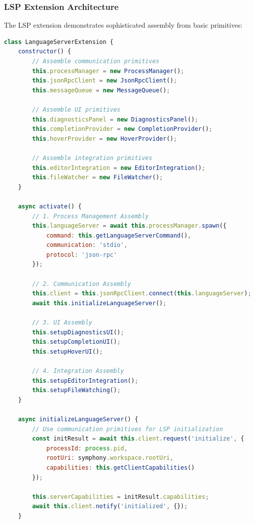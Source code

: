 \subsubsection*{LSP Extension Architecture}

The LSP extension demonstrates sophisticated assembly from basic primitives:

\begin{lstlisting}[language=JavaScript, caption=LSP Extension Assembly Process]
class LanguageServerExtension {
    constructor() {
        // Assemble communication primitives
        this.processManager = new ProcessManager();
        this.jsonRpcClient = new JsonRpcClient();
        this.messageQueue = new MessageQueue();
        
        // Assemble UI primitives
        this.diagnosticsPanel = new DiagnosticsPanel();
        this.completionProvider = new CompletionProvider();
        this.hoverProvider = new HoverProvider();
        
        // Assemble integration primitives
        this.editorIntegration = new EditorIntegration();
        this.fileWatcher = new FileWatcher();
    }
    
    async activate() {
        // 1. Process Management Assembly
        this.languageServer = await this.processManager.spawn({
            command: this.getLanguageServerCommand(),
            communication: 'stdio',
            protocol: 'json-rpc'
        });
        
        // 2. Communication Assembly
        this.client = this.jsonRpcClient.connect(this.languageServer);
        await this.initializeLanguageServer();
        
        // 3. UI Assembly
        this.setupDiagnosticsUI();
        this.setupCompletionUI();
        this.setupHoverUI();
        
        // 4. Integration Assembly
        this.setupEditorIntegration();
        this.setupFileWatching();
    }
    
    async initializeLanguageServer() {
        // Use communication primitives for LSP initialization
        const initResult = await this.client.request('initialize', {
            processId: process.pid,
            rootUri: symphony.workspace.rootUri,
            capabilities: this.getClientCapabilities()
        });
        
        this.serverCapabilities = initResult.capabilities;
        await this.client.notify('initialized', {});
    }
    

\end{lstlisting}

